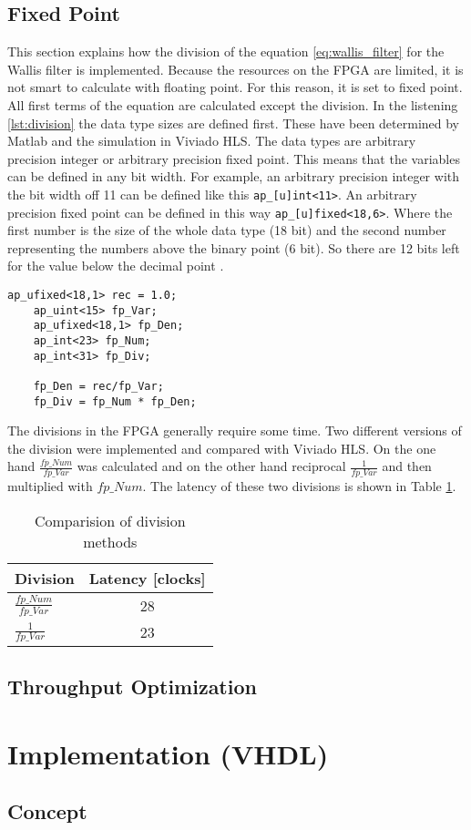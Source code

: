 \subsection{Fixed Point}
This section explains how the division of the equation \ref{eq:wallis_filter} for the Wallis filter is implemented. Because the resources on the FPGA are limited, it is not smart to calculate with floating point. For this reason, it is set to fixed point. \\
All first terms of the equation are calculated except the division. In the listening \ref{lst:division} the data type sizes are defined first. These have been determined by Matlab and the simulation in Viviado HLS. 
The data types are arbitrary precision integer or arbitrary precision fixed point. This means that the variables can be defined in any bit width. For example, an arbitrary precision integer with the bit width off 11 can be defined like this \texttt{ap\_[u]int<11>}. An arbitrary precision fixed point can be defined in this way \texttt{ap\_[u]fixed<18,6>}. Where the first number is the size of the whole data type (18 bit) and the second number representing the numbers above the binary point (6 bit). So there are 12 bits left for the value below the decimal point \cite{ug902}. \\   
\begin{minipage}{\textwidth}
\begin{lstlisting}[style=CStyle, caption=Calculation of the division for the Wallis filter, label=lst:division]
	ap_ufixed<18,1> rec = 1.0;
	ap_uint<15> fp_Var;
	ap_ufixed<18,1> fp_Den;
	ap_int<23> fp_Num;
	ap_int<31> fp_Div;

	fp_Den = rec/fp_Var;
	fp_Div = fp_Num * fp_Den;
\end{lstlisting}
\end{minipage}

The divisions in the FPGA generally require some time. Two different versions of the division were implemented and compared with Viviado HLS. On the one hand $\frac{fp\_Num}{fp\_Var}$ was calculated and on the other hand reciprocal $\frac{1}{fp\_Var}$ and then multiplied with $fp\_Num$. The latency of these two divisions is shown in Table \ref{tab:c_div}. 
\begin{table}[tb!]
    \centering
    \begin{tabular}{l c}
        \toprule
        Division & Latency [clocks]  \\
        \midrule
        $\frac{fp\_Num}{fp\_Var}$ & 28 
        \\
        $\frac{1}{fp\_Var}$ & 23 
        \\
        \bottomrule
    \end{tabular}
    \caption{Comparision of division methods}
    \label{tab:c_div}
\end{table}

\subsection{Throughput Optimization}

\section{Implementation (VHDL)} \label{ch:ip:imp_vhdl}

\subsection{Concept}